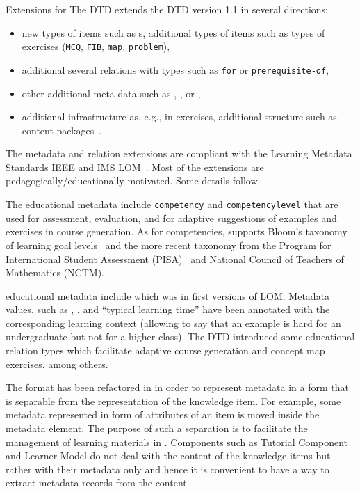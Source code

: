 \begin{omgroup}[id=activemath,short=ActiveMath,
  creators={melis,goguadse,alberto,frischauf,homik,libbrecht,cullrich}]
\begin{omgroup}{{\omdoc} Extensions for {\activemath}}
The {\activemath} DTD extends the {\omdoc} DTD version 1.1 in several directions:
\begin{itemize}
\item new types of items such as s, additional types of items such
  as types of exercises ({\tt{MCQ}}, {\tt{FIB}}, {\tt{map}}, {\tt{problem}}),
\item additional several relations with types such as {\tt{for}} or {\tt{prerequisite-of}},
\item other additional meta data such as {}, {}, or
  {},
\item additional infrastructure as, e.g., in exercises, additional structure such as
  content packages~\cite{LeAMD6}.
\end{itemize}
The metadata and relation extensions are compliant with the Learning Metadata Standards
IEEE and IMS LOM~\cite{lom3_6,ims_lom}. Most of the extensions are
pedagogically/educationally motivated. Some details follow.

The educational metadata include {\tt{competency}} and {\tt{competencylevel}} that are used
for assessment, evaluation, and for adaptive suggestions of examples and exercises in
course generation.  As for competencies, {\activemath} supports Bloom's taxonomy of
learning goal levels~\cite{bloom56} and the more recent taxonomy from the Program for
International Student Assessment (PISA)~\cite{klieme04} and National Council of Teachers
of Mathematics (NCTM).

{\activemath} educational metadata include {} which was in
first versions of LOM.  Metadata values, such as {},
{}, and ``typical learning time'' have been annotated with the
corresponding learning context (allowing to say that an example is hard for an
undergraduate but not for a higher class).  The {\activemath} DTD introduced some
educational relation types which facilitate adaptive course generation and concept map
exercises, among others.

The {\omdoc} format has been refactored in {\activemath} in order to represent metadata in
a form that is separable from the representation of the knowledge item. For example, some
metadata represented in form of attributes of an item is moved inside the metadata
element. The purpose of such a separation is to facilitate the management of learning
materials in {\activemath}. Components such as Tutorial Component and Learner Model do not
deal with the content of the knowledge items but rather with their metadata only and hence
it is convenient to have a way to extract metadata records from the content.
 

\end{omgroup}
\end{omgroup}
